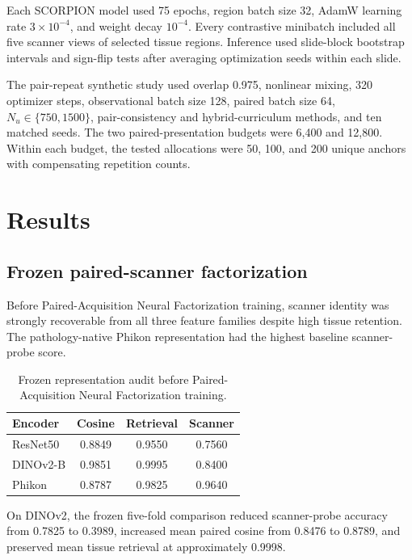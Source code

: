 \documentclass[10pt]{article}
\begin{document}
Each SCORPION model used 75 epochs, region batch size 32, AdamW learning rate $3\times10^{-4}$, and weight decay $10^{-4}$. Every contrastive minibatch included all five scanner views of selected tissue regions. Inference used slide-block bootstrap intervals and sign-flip tests after averaging optimization seeds within each slide.

The pair-repeat synthetic study used overlap 0.975, nonlinear mixing, 320 optimizer steps, observational batch size 128, paired batch size 64, $N_u\in\{750,1500\}$, pair-consistency and hybrid-curriculum methods, and ten matched seeds. The two paired-presentation budgets were 6,400 and 12,800. Within each budget, the tested allocations were 50, 100, and 200 unique anchors with compensating repetition counts.

\section{Results}
\subsection{Frozen paired-scanner factorization}
Before Paired-Acquisition Neural Factorization training, scanner identity was strongly recoverable from all three feature families despite high tissue retention. The pathology-native Phikon representation had the highest baseline scanner-probe score.

\begin{table}[t]
\centering
\caption{Frozen representation audit before Paired-Acquisition Neural Factorization training.}
\scriptsize
\setlength{\tabcolsep}{2.6pt}
\begin{tabular}{@{}lccc@{}}
\toprule
Encoder & Cosine & Retrieval & Scanner \\
\midrule
ResNet50 & 0.8849 & 0.9550 & 0.7560 \\
DINOv2-B & 0.9851 & 0.9995 & 0.8400 \\
Phikon & 0.8787 & 0.9825 & 0.9640 \\
\bottomrule
\end{tabular}
\label{tab:frozen_audit}
\end{table}

On DINOv2, the frozen five-fold comparison reduced scanner-probe accuracy from 0.7825 to 0.3989, increased mean paired cosine from 0.8476 to 0.8789, and preserved mean tissue retrieval at approximately 0.9998.
\end{document}
